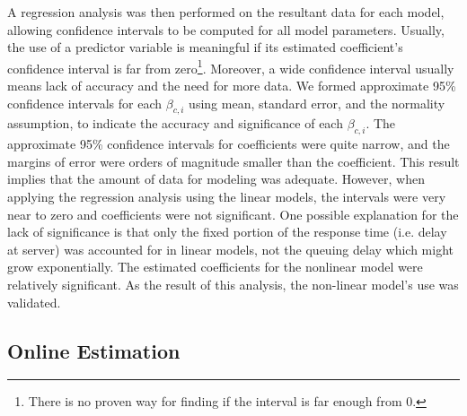 A regression analysis was then performed on the resultant data for each model, allowing confidence intervals to be computed for all model parameters.
Usually, the use of a predictor variable is meaningful if its estimated coefficient's confidence interval is far from zero\footnote{There is no proven way for finding if the interval is far enough from 0.}. Moreover, a wide confidence interval usually means lack of accuracy and the need for more data. We formed approximate 95\% confidence intervals for each $\beta_{c,i}$ using mean, standard error, and the normality assumption, to indicate the accuracy and significance of each $\beta_{c,i}$. 
The approximate 95\% confidence intervals for coefficients were quite narrow, and the margins of error were orders of magnitude smaller than the coefficient. This result implies that the amount of data for modeling was adequate.
However, when applying the regression analysis using the linear models, the intervals were very near to zero and coefficients were not significant.
One possible explanation for the lack of significance is that only the fixed portion of the response time (i.e. delay at server) was accounted for in linear models, not the queuing delay which might grow exponentially. 
 The estimated coefficients for the nonlinear model were relatively significant.
As the result of this analysis, the non-linear model's use was validated. 




% 
\subsection{Online Estimation}
\label{sec:online-model-estimation}

